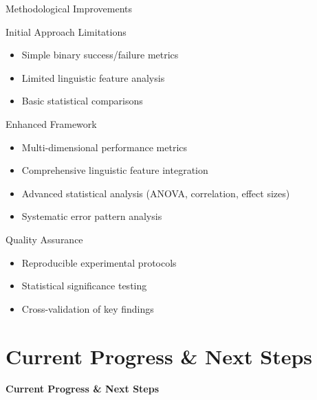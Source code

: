 \documentclass[aspectratio=169]{beamer}
\begin{document}
\begin{frame}{Methodological Improvements}
\begin{block}{Initial Approach Limitations}
\begin{itemize}
    \item Simple binary success/failure metrics
    \item Limited linguistic feature analysis
    \item Basic statistical comparisons
\end{itemize}
\end{block}

\begin{block}{Enhanced Framework}
\begin{itemize}
    \item Multi-dimensional performance metrics
    \item Comprehensive linguistic feature integration
    \item Advanced statistical analysis (ANOVA, correlation, effect sizes)
    \item Systematic error pattern analysis
\end{itemize}
\end{block}

\begin{block}{Quality Assurance}
\small
\begin{itemize}
    \item Reproducible experimental protocols
    \item Statistical significance testing
    \item Cross-validation of key findings
\end{itemize}
\end{block}
\end{frame}

\section{Current Progress \& Next Steps}

\begin{frame}
\begin{center}
\Huge \textbf{Current Progress \& Next Steps}
\end{center}
\end{frame}
\end{document}

